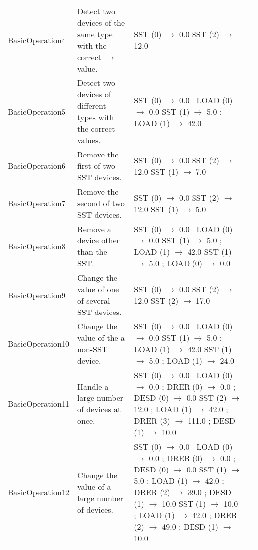 \documentclass{article}
\begin{document}
\begin{center}
\begin{footnotesize}
\begin{longtable}{|p{3cm}|p{4cm}|p{10cm}|c|}
    BasicOperation4 & Detect two devices of the same type with the correct $\rightarrow$ value. & SST (0) $\rightarrow$ 0.0 \newline SST (2) $\rightarrow$ 12.0 & \\
    BasicOperation5 & Detect two devices of different types with the correct values. & SST (0) $\rightarrow$ 0.0 ; LOAD (0) $\rightarrow$ 0.0 \newline SST (1) $\rightarrow$ 5.0 ; LOAD (1) $\rightarrow$ 42.0 & \\
    BasicOperation6 & Remove the first of two SST devices. & SST (0) $\rightarrow$ 0.0 \newline SST (2) $\rightarrow$ 12.0 \newline SST (1) $\rightarrow$ 7.0 & \\
    BasicOperation7 & Remove the second of two SST devices. & SST (0) $\rightarrow$ 0.0 \newline SST (2) $\rightarrow$ 12.0 \newline SST (1) $\rightarrow$ 5.0 & \\
    BasicOperation8 & Remove a device other than the SST. & SST (0) $\rightarrow$ 0.0 ; LOAD (0) $\rightarrow$ 0.0 \newline SST (1) $\rightarrow$ 5.0 ; LOAD (1) $\rightarrow$ 42.0 \newline SST (1) $\rightarrow$ 5.0 ; LOAD (0) $\rightarrow$ 0.0 & \\
    BasicOperation9 & Change the value of one of several SST devices. & SST (0) $\rightarrow$ 0.0 \newline SST (2) $\rightarrow$ 12.0 \newline SST (2) $\rightarrow$ 17.0 & \\
    BasicOperation10 & Change the value of the a non-SST device. & SST (0) $\rightarrow$ 0.0 ; LOAD (0) $\rightarrow$ 0.0 \newline SST (1) $\rightarrow$ 5.0 ; LOAD (1) $\rightarrow$ 42.0 \newline SST (1) $\rightarrow$ 5.0 ; LOAD (1) $\rightarrow$ 24.0 & \\
    BasicOperation11 & Handle a large number of devices at once. &  SST (0) $\rightarrow$ 0.0 ; LOAD (0) $\rightarrow$ 0.0 ; DRER (0) $\rightarrow$ 0.0 ; DESD (0) $\rightarrow$ 0.0 \newline SST (2) $\rightarrow$ 12.0 ; LOAD (1) $\rightarrow$ 42.0 ; DRER (3) $\rightarrow$ 111.0 ; DESD (1) $\rightarrow$ 10.0 & \\
    BasicOperation12 & Change the value of a large number of devices. & SST (0) $\rightarrow$ 0.0 ; LOAD (0) $\rightarrow$ 0.0 ; DRER (0) $\rightarrow$ 0.0 ; DESD (0) $\rightarrow$ 0.0 \newline SST (1) $\rightarrow$ 5.0 ; LOAD (1) $\rightarrow$ 42.0 ; DRER (2) $\rightarrow$ 39.0 ; DESD (1) $\rightarrow$ 10.0 \newline SST (1) $\rightarrow$ 10.0 ; LOAD (1) $\rightarrow$ 42.0 ; DRER (2) $\rightarrow$ 49.0 ; DESD (1) $\rightarrow$ 10.0 & \\

\end{longtable}
\end{footnotesize}
\end{center}
\end{document}
